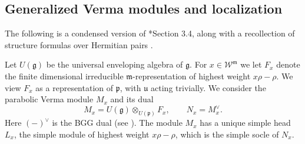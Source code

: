 \documentclass[12pt]{amsart}
\theoremstyle{definition}
\numberwithin{equation}{section}
\newcommand{\g}{\mathfrak g}
\newcommand{\m}{\mathfrak m}
\newcommand{\p}{\mathfrak p}
\newcommand{\W}{\mathscr W}
\begin{document}
\subsection{Generalized Verma modules and localization}\label{sec:Verma} The following is a condensed version of \cite{schubertLC}*{Section 3.4}, along with a recollection of structure formulas over Hermitian pairs \cite{cisWeight}.

Let $U(\g)$ be the universal enveloping algebra of $\g$. For $x\in \W^{\m}$ we let $F_x$ denote the finite dimensional irreducible $\mathfrak{m}$-representation of highest weight $x\rho-\rho$. We view $F_x$ as a representation of $\p$, with $\mathfrak{u}$ acting trivially. We consider the parabolic Verma module $M_x$ and its dual
\begin{equation}\label{eq:standards-costandards}
M_x=U(\g)\otimes_{U(\p)}F_x,
\qquad
N_x=M_x^\vee.
\end{equation}
Here $(-)^\vee$ is the BGG dual (see \cite[Section 3.2]{HumphreysO}). The module $M_x$ has a unique simple head $L_x$, the simple module of highest weight $x\rho-\rho$, which is the simple socle of $N_x$.
\end{document}
